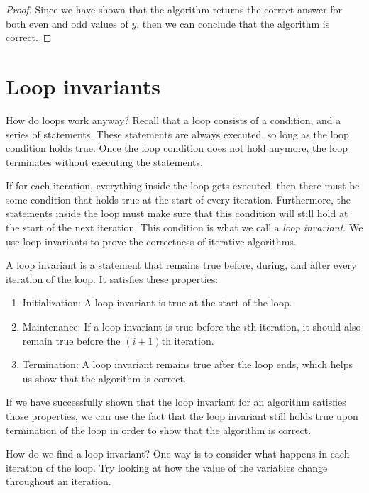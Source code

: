 \begin{example}
\begin{proof}
        Since we have shown that the algorithm returns the correct answer for both even and odd values of $y$, then we can conclude that the algorithm is correct.
    \end{proof}
\end{example}

\section{Loop invariants}
How do loops work anyway? Recall that a loop consists of a condition, and a series of statements. These statements are always executed, so long as the loop condition holds true. Once the loop condition does not hold anymore, the loop terminates without executing the statements.

If for each iteration, everything inside the loop gets executed, then there must be some condition that holds true at the start of every iteration. Furthermore, the statements inside the loop must make sure that this condition will still hold at the start of the next iteration. This condition is what we call a \textit{loop invariant}. We use loop invariants to prove the correctness of iterative algorithms.

\begin{definition}
A loop invariant is a statement that remains true before, during, and after every iteration of the loop. It satisfies these properties:
\begin{enumerate}
    \item Initialization: A loop invariant is true at the start of the loop.
    \item Maintenance: If a loop invariant is true before the $i$th iteration, it should also remain true before the $\left(i+1\right)$th iteration.
    \item Termination: A loop invariant remains true after the loop ends, which helps us show that the algorithm is correct.
\end{enumerate}
\end{definition}

If we have successfully shown that the loop invariant for an algorithm satisfies those properties, we can use the fact that the loop invariant still holds true upon termination of the loop in order to show that the algorithm is correct.

How do we find a loop invariant? One way is to consider what happens in each iteration of the loop. Try looking at how the value of the variables change throughout an iteration.

